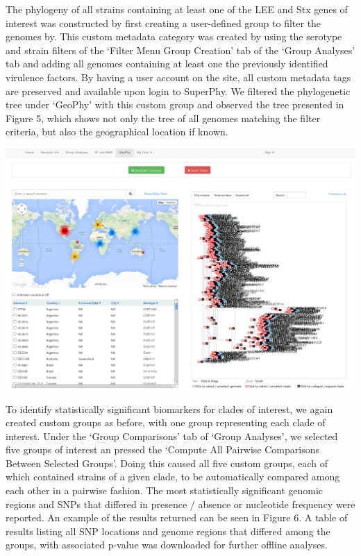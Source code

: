 \documentclass[doublespacing, linenumbers]{bmcart}
\begin{document}
The phylogeny of all strains containing at least one of the LEE and Stx genes of interest was constructed by first creating a user-defined group to filter the genomes by. This custom metadata category was created by using the serotype and strain filters of the `Filter Menu Group Creation' tab of the `Group Analyses' tab and adding all genomes containing at least one the previously identified virulence factors. By having a user account on the site, all custom metadata tags are preserved and available upon login to SuperPhy. We filtered the phylogenetic tree under `GeoPhy' with this custom group and observed the tree presented in Figure 5, which shows not only the tree of all genomes matching the filter criteria, but also the geographical location if known.

\includegraphics[width=\textwidth]{images/hazen_lineages.png}

To identify statistically significant biomarkers for clades of interest, we again created custom groups as before, with one group representing each clade of interest. Under the `Group Comparisons' tab of `Group Analyses', we selected five groups of interest an pressed the `Compute All Pairwise Comparisons Between Selected Groups'. Doing this caused all five custom groups, each of which contained strains of a given clade, to be automatically compared among each other in a pairwise fashion. The most statistically significant genomic regions  and SNPs that differed in presence / absence or nucleotide frequency were reported. An example of the results returned can be seen in Figure 6. A table of results listing all SNP locations and genome regions that differed among the groups, with associated p-value was downloaded for further offline analyses.
\end{document}
